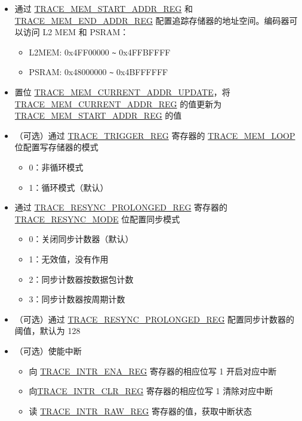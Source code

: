 \documentclass[main\_\_CN.tex]{subfiles}
\begin{document}
\begin{itemize}
    \item 通过 \hyperref[regdesc:TRACEMEMSTARTADDRREG]{TRACE\_MEM\_START\_ADDR\_REG} 和 \hyperref[regdesc:TRACEMEMENDADDRREG]{TRACE\_MEM\_END\_ADDR\_REG} 配置追踪存储器的地址空间。编码器可以访问 L2 MEM 和 PSRAM：
        \begin{itemize}
            \item L2MEM: 0x4FF00000 \verb+~+ 0x4FFBFFFF
            \item PSRAM: 0x48000000 \verb+~+ 0x4BFFFFFF
        \end{itemize}
    \item 置位 \hyperref[fielddesc:TRACEMEMCURRENTADDRUPDATE]{TRACE\_MEM\_CURRENT\_ADDR\_UPDATE}，将 \hyperref[regdesc:TRACEMEMCURRENTADDRREG]{TRACE\_MEM\_CURRENT\_ADDR\_REG} 的值更新为 \hyperref[regdesc:TRACEMEMSTARTADDRREG]{TRACE\_MEM\_START\_ADDR\_REG} 的值

    \item（可选）通过 \hyperref[regdesc:TRACETRIGGERREG]{TRACE\_TRIGGER\_REG} 寄存器的 \hyperref[fielddesc:TRACEMEMLOOP]{TRACE\_MEM\_LOOP} 位配置写存储器的模式
        \begin{itemize}
            \item 0：非循环模式
            \item 1：循环模式（默认）
        \end{itemize}


    \item 通过 \hyperref[regdesc:TRACERESYNCPROLONGEDREG]{TRACE\_RESYNC\_PROLONGED\_REG} 寄存器的 \hyperref[fielddesc:TRACERESYNCMODE]{TRACE\_RESYNC\_MODE} 位配置同步模式
        \begin{itemize}
            \item 0：关闭同步计数器（默认）
            \item 1：无效值，没有作用
            \item 2：同步计数器按数据包计数
            \item 3：同步计数器按周期计数
                \end{itemize}

    \item（可选）通过 \hyperref[regdesc:TRACERESYNCPROLONGEDREG]{TRACE\_RESYNC\_PROLONGED\_REG} 配置同步计数器的阈值，默认为 128

    \item（可选）使能中断
        \begin{itemize}
            \item 向 \hyperref[regdesc:TRACEINTRENAREG]{TRACE\_INTR\_ENA\_REG} 寄存器的相应位写 1 开启对应中断
            \item 向\hyperref[regdesc:TRACEINTRCLRREG]{TRACE\_INTR\_CLR\_REG} 寄存器的相应位写 1 清除对应中断
            \item 读 \hyperref[regdesc:TRACEINTRRAWREG]{TRACE\_INTR\_RAW\_REG} 寄存器的值，获取中断状态
        \end{itemize}


\end{itemize}
\end{document}
